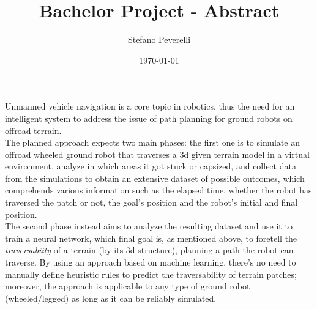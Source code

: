 \documentclass{article}[12pt]
\begin{document}
\title{Bachelor Project - Abstract}
\author{Stefano Peverelli}
\date{\today}
\maketitle
Unmanned vehicle navigation is a core topic in robotics, thus the need for an intelligent system to 
address the issue of path planning for ground robots on offroad terrain. \\
The planned approach expects two main phases: the first one is to simulate an offroad wheeled
ground robot that traverses a 3d given terrain model in a virtual environment, analyze in which areas it
got stuck or capsized, and collect data from the simulations to obtain an extensive
dataset of possible outcomes, which comprehends various information such as the elapsed time,
whether the robot has traversed the patch or not, the goal's position and the robot's initial and
final position. \\
The second phase instead aims to analyze the resulting dataset and use it to train a neural network,
which final goal is, as mentioned above, to foretell the \textit{traversabiity} of a terrain (by its 3d structure),
planning a path the robot can traverse.
By using an approach based on machine learning, there's no need to manually define heuristic
rules to predict the traversability of terrain patches; moreover, the approach is applicable
to any type of ground robot (wheeled/legged) as long as it can be reliably simulated.
\end{document}
